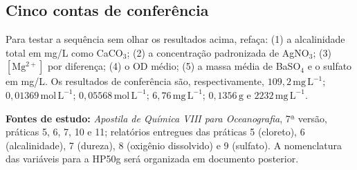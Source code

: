 \documentclass[11pt,a4paper]{article}
\newcommand{\molL}{\mathrm{mol\,L^{-1}}}
\newcommand{\mgL}{\mathrm{mg\,L^{-1}}}
\begin{document}
\subsection*{Cinco contas de conferência}
Para testar a sequência sem olhar os resultados acima, refaça: (1) a alcalinidade total em mg/L como CaCO$_3$; (2) a concentração padronizada de AgNO$_3$; (3) $[\mathrm{Mg^{2+}}]$ por diferença; (4) o OD médio; (5) a massa média de BaSO$_4$ e o sulfato em mg/L. Os resultados de conferência são, respectivamente, $109{,}2\,\mgL$; $0{,}01369\,\molL$; $0{,}05568\,\molL$; $6{,}76\,\mgL$; $0{,}1356\,\mathrm{g}$ e $2232\,\mgL$.

\bigskip\noindent\textbf{Fontes de estudo:} \emph{Apostila de Química VIII para Oceanografia}, 7ª versão, práticas 5, 6, 7, 10 e 11; relatórios entregues das práticas 5 (cloreto), 6 (alcalinidade), 7 (dureza), 8 (oxigênio dissolvido) e 9 (sulfato). A nomenclatura das variáveis para a HP50g será organizada em documento posterior.
\end{document}
